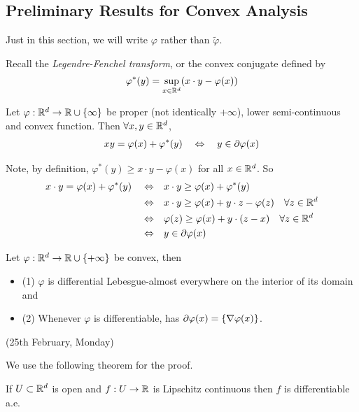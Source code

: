 \documentclass[12pt,a4paper]{article}
\newenvironment{proof}
{\begin{changemargin}{1cm}{0.5cm} 
	}%
	{\end{changemargin}
}
\renewenvironment{i}
{\begin{itemize} 
	}%
	{\end{itemize}
}
\newenvironment{p}
{\begin{proof} 
	}%
	{\end{proof}
}
\begin{document}
\subsection{Preliminary Results for Convex Analysis}

Just in this section, we will write $\varphi$ rather than $\tilde{\varphi}$.
\s

Recall the \emph{Legendre-Fenchel transform}, or the convex conjugate defined by
\begin{align*}
\varphi^*(y) = \sup_{x\in \mathbb{R}^d} (x\cdot y - \varphi(x))
\end{align*}
\s

 Let $\varphi : \mathbb{R}^d \rightarrow \mathbb{R}\cup \{\infty\}$ be proper (not identically $+ \infty$), lower semi-continuous and convex function. Then $\forall x, y\in \mathbb{R}^d$, 
\begin{align*}
xy = \varphi(x) + \varphi^*(y) \quad \Leftrightarrow \quad y\in \partial \varphi(x)
\end{align*}
\begin{p}
\pf Note, by definition, $\varphi^*(y) \geq x\cdot y - \varphi(x)$ for all $x\in \mathbb{R}^d$. So
\begin{align*}
x\cdot y= \varphi(x) + \varphi^*(y) \quad \Leftrightarrow & \quad x\cdot y \geq \varphi(x) + \varphi^*(y) \\
\Leftrightarrow & \quad x\cdot y \geq \varphi(x) + y\cdot z - \varphi(z) \quad \forall z\in \mathbb{R}^d \\
\Leftrightarrow & \quad \varphi(z) \geq \varphi(x) + y\cdot(z-x) \quad \forall z\in \mathbb{R}^d \\
\Leftrightarrow & \quad y\in \partial \varphi(x)
\end{align*}
\eop
\end{p}
\s

 Let $\varphi : \mathbb{R}^d \rightarrow \mathbb{R} \cup \{+\infty \}$ be convex, then
\begin{i}
\item[(1)] $\varphi$ is differential Lebesgue-almost everywhere on the interior of its domain and
\item[(2)] Whenever $\varphi$ is differentiable, has $\partial \varphi(x) = \{\nabla \varphi(x) \}$.
\end{i}
\s

\newday

(25th February, Monday)
\s

We use the following theorem for the proof.
\s

 If $U\subset \mathbb{R}^d$ is open and $f:U\rightarrow \mathbb{R}$ is Lipschitz continuous then $f$ is differentiable a.e.
\end{document}
